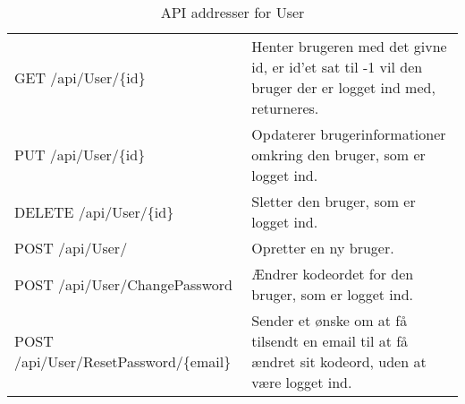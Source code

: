 \begin{table}[H]
	\centering
	\caption{API addresser for User}
	\label{tab:web_user}
	\begin{tabular}{|L{0.3\textwidth}|L{0.70\textwidth}|}
		\hline
		\\
		\hline
		GET \newline
		/api/User/\{id\} &
		Henter brugeren med det givne id, er id'et sat til -1 vil den bruger der er logget ind med, returneres. \\
		\hline
		PUT \newline
		/api/User/\{id\} &
		Opdaterer brugerinformationer omkring den bruger, som er logget ind. \\
		\hline
		DELETE \newline
		/api/User/\{id\} &
		Sletter den bruger, som er logget ind. \\
		\hline
		POST \newline
		/api/User/ &
		Opretter en ny bruger. \\
		\hline
		POST \newline
		/api/User/ChangePassword &
		Ændrer kodeordet for den bruger, som er logget ind. \\
		\hline
		POST \newline
		/api/User/ResetPassword/\{email\} &
		Sender et ønske om at få tilsendt en email til at få ændret sit kodeord, uden at være logget ind. 
		\\
		\hline
	\end{tabular}
\end{table}


